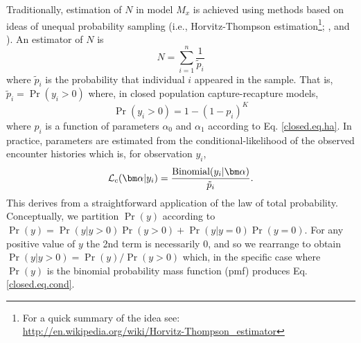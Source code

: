 Traditionally, estimation of $N$ in model $M_{x}$ is
achieved using methods based on ideas of unequal probability sampling
(i.e., Horvitz-Thompson estimation\footnote{For a  quick summary of
  the idea see: \\
  \url{http://en.wikipedia.org/wiki/Horvitz-Thompson_estimator}};
\citet{huggins:1989},
\citet{alho:1990} and \citet{borchers_etal:2002}). An estimator of $N$ is
\[
\hat{N} = \sum_{i=1}^{n} \frac{1}{\tilde{p}_{i}}
\]
where $\tilde{p}_{i}$ is the probability that individual $i$ appeared
in the sample.  That is, $\tilde{p}_{i} = \Pr(y_{i}>0)$
where, in closed population capture-recapture models,
\[
\Pr(y_{i}>0) = 1- (1-p_{i})^K
\]
where $p_{i}$ is a function of parameters $\alpha_{0}$ and $\alpha_{1}$
according to Eq. \ref{closed.eq.ha}.  In practice, parameters are
estimated from the conditional-likelihood of the observed encounter
histories which is, for observation $y_{i}$,
\begin{equation}
{\cal L}_{c}( {\bm \alpha} | y_{i}) = \frac{ \mbox{Binomial}(y_{i}|{\bm \alpha}) } { \tilde{p}_{i}}.
\label{closed.eq.cond}
\end{equation}
This derives from a straightforward application of the law of total
probability. Conceptually, we partition $\Pr(y)$ according to
$\Pr(y) = \Pr(y|y>0)\Pr(y>0) + \Pr(y|y=0)\Pr(y=0)$. For any positive
value of $y$ the 2nd term is necessarily 0, and so we rearrange to
obtain
$\Pr(y|y>0) = \Pr(y)/\Pr(y>0)$ which, in the specific case where
$\Pr(y)$ is the
binomial probability mass function (pmf) produces Eq. \ref{closed.eq.cond}.


